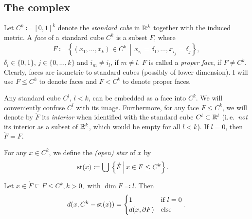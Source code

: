 \subsection{The complex}
\label{sec:complex}


\begin{defin}
  Let \(C^k \coloneqq {[0,1]}^k\) denote the \emph{standard cube} in \(\mathbb{R}^k\) together with the induced metric. A \emph{face} of a standard cube \(C^k\) is a subset \(F\), where
  \begin{align*}
    F \coloneqq \left\{(x_1, \dots, x_k) \in C^k \,\middle |\, x_{i_1} = \delta_1, \dots, x_{i_j}  = \delta_j\right\},
  \end{align*}
  \(\delta_i \in \{0, 1\}\), \(j \in \{0, \dots, k\}\) and \(i_m \neq i_l\), if \(m \neq l\). \(F\) is called a \emph{proper face}, if \(F \neq C^k\). Clearly, faces are isometric to standard cubes (possibly of lower dimension). I will use \(F \leq C^k\) to denote faces and \(F < C^k\) to denote proper faces.

  Any standard cube \(C^l\), \(l < k\), can be embedded as a face into \(C^k\). We will conveniently confuse \(C^l\) with its image. Furthermore, for any face \(F \leq C^k\), we will denote by \(\mathring{F}\) its \emph{interior} when identified with the standard cube \(C^l \subset \mathbb{R}^l\) (i.\,e.\ \emph{not} its interior as a subset of \(\mathbb{R}^k\), which would be empty for all \(l < k\)). If \(l = 0\), then \(\mathring{F} = F\).

  For any \(x \in C^k\), we define the \emph{(open) star} of \(x\) by
  \begin{align*}
    \operatorname{st}(x) & \coloneqq \bigcup\,\left\{\mathring{F} \,\middle|\, x \in F \leq C^k\right\}.
  \end{align*}
\end{defin}

\begin{lemma}
  \label{lemma:cube-dist}
  Let \(x \in \mathring{F} \subseteq F \leq C^k, k > 0,\) with \(\dim F \eqqcolon l\). Then
  \begin{align*}
    d(x, C^k - \operatorname{st}(x)) =
    \begin{cases}
      1 & \text{if } l = 0\\
      d(x, \partial F) & \text{else}
    \end{cases}
                         .
  \end{align*}
\end{lemma}

